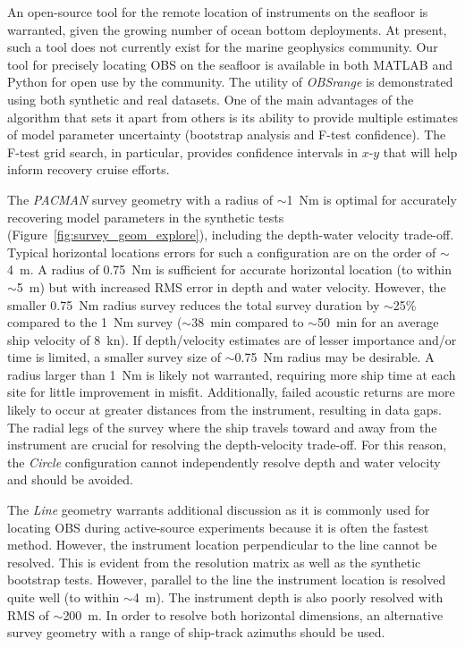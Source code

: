 An open-source tool for the remote location of instruments on the seafloor is warranted, given the growing number of ocean bottom deployments. At present, such a tool does not currently exist for the marine geophysics community. Our tool for precisely locating OBS on the seafloor is available in both MATLAB and Python for open use by the community. The utility of \textit{OBSrange} is demonstrated using both synthetic and real datasets. One of the main advantages of the algorithm that sets it apart from others is its ability to provide multiple estimates of model parameter uncertainty (bootstrap analysis and F-test confidence). The F-test grid search, in particular, provides confidence intervals in $x$-$y$ that will help inform recovery cruise efforts.

The \textit{PACMAN} survey geometry with a radius of $\sim$1~Nm is optimal for accurately recovering model parameters in the synthetic tests (Figure~\ref{fig:survey_geom_explore}), including the depth-water velocity trade-off. Typical horizontal locations errors for such a configuration are on the order of $\sim$4~m. A radius of 0.75~Nm is sufficient for accurate horizontal location (to within $\sim$5~m) but with increased RMS error in depth and water velocity. However, the smaller 0.75~Nm radius survey reduces the total survey duration by $\sim$25\% compared to the 1~Nm survey ($\sim$38~min compared to $\sim$50~min for an average ship velocity of 8~kn). If depth/velocity estimates are of lesser importance and/or time is limited, a smaller survey size of $\sim$0.75~Nm radius may be desirable. A radius larger than 1~Nm is likely not warranted, requiring more ship time at each site for little improvement in misfit. Additionally, failed acoustic returns are more likely to occur at greater distances from the instrument, resulting in data gaps. The radial legs of the survey where the ship travels toward and away from the instrument are crucial for resolving the depth-velocity trade-off. For this reason, the \textit{Circle} configuration cannot independently resolve depth and water velocity and should be avoided.

The \textit{Line} geometry warrants additional discussion as it is commonly used for locating OBS during active-source experiments because it is often the fastest method. However, the instrument location perpendicular to the line cannot be resolved. This is evident from the resolution matrix as well as the synthetic bootstrap tests. However, parallel to the line the instrument location is resolved quite well (to within $\sim$4~m). The instrument depth is also poorly resolved with RMS of $\sim$200~m. In order to resolve both horizontal dimensions, an alternative survey geometry with a range of ship-track azimuths should be used.

